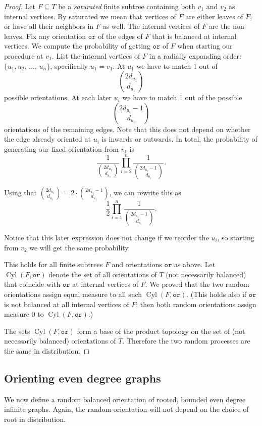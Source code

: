 \documentclass[11pt]{article}
\theoremstyle{definition}
\numberwithin{equation}{section}
\numberwithin{figure}{section}
\numberwithin{table}{section}
\newcommand{\ortt}{\texttt{or}}
\DeclareMathOperator{\Cyl}{Cyl}
\begin{document}
\begin{proof}
Let $F \subseteq T$ be a \emph{saturated} finite subtree containing both $v_1$ and $v_2$ as internal vertices. By saturated we mean that vertices of $F$ are either leaves of $F$, or have all their neighbors in $F$ as well. The internal vertices of $F$ are the non-leaves. Fix any orientation $\ortt$ of the edges of $F$ that is balanced at internal vertices. We compute the probability of getting $\ortt$ of $F$ when starting our procedure at $v_1$. List the internal vertices of $F$ in a radially expanding order: $\{u_1, u_2,\,\ldots,\,u_n\}$, specifically $u_1 = v_1$. At $u_1$ we have to match 1 out of
\[
\binom{2d_{u_1}}{d_{u_1}}
\]
possible orientations. At each later $u_i$ we have to match 1 out of the possible
\[
\binom{2d_{u_i}-1}{d_{u_i}}
\]
orientations of the remaining edges. Note that this does not depend on whether the edge already oriented at $u_i$ is inwards or outwards. In total, the probability of generating our fixed orientation from $v_1$ is
\[
\frac{1}{\binom{2d_{u_1}}{d_{u_1}}}\prod_{i=2}^{n}\frac{1}{\binom{2d_{u_i}-1}{d_{u_i}}}.
\]

Using that $\binom{2d_{u_1}}{d_{u_1}} = 2 \cdot \binom{2d_{u_1}-1}{d_{u_1}}$, we can rewrite this as
\[
\frac{1}{2}\prod_{i=1}^{n}\frac{1}{\binom{2d_{u_i}-1}{d_{u_i}}}.
\]

Notice that this later expression does not change if we reorder the $u_i$, so starting from $v_2$ we will get the same probability.

This holds for all finite subtrees $F$ and orientations $\ortt$ as above. Let $\Cyl(F,\ortt)$ denote the set of all orientations of $T$ (not necessarily balanced) that coincide with $\ortt$ at internal vertices of $F$. We proved that the two random orientations assign equal measure to all such $\Cyl(F,\ortt)$. (This holds also if $\ortt$ is not balanced at all internal vertices of $F$; then both random orientations assign measure 0 to $\Cyl(F,\ortt)$.)

The sets $\Cyl(F,\ortt)$ form a base of the product topology on the set of (not necessarily balanced) orientations of $T$. Therefore the two random processes are the same in distribution.
\end{proof}


\subsection{Orienting even degree graphs}
We now define a random balanced orientation of rooted, bounded even degree infinite graphs. Again, the random orientation will not depend on the choice of root in distribution.
\end{document}
